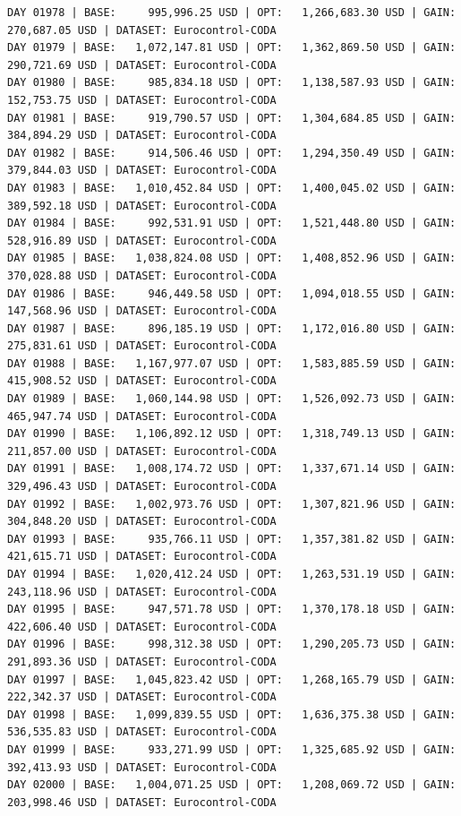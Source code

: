 \documentclass[11pt,a4paper]{article}
\begin{document}
\begin{verbatim}
DAY 01978 | BASE:     995,996.25 USD | OPT:   1,266,683.30 USD | GAIN: 270,687.05 USD | DATASET: Eurocontrol-CODA
DAY 01979 | BASE:   1,072,147.81 USD | OPT:   1,362,869.50 USD | GAIN: 290,721.69 USD | DATASET: Eurocontrol-CODA
DAY 01980 | BASE:     985,834.18 USD | OPT:   1,138,587.93 USD | GAIN: 152,753.75 USD | DATASET: Eurocontrol-CODA
DAY 01981 | BASE:     919,790.57 USD | OPT:   1,304,684.85 USD | GAIN: 384,894.29 USD | DATASET: Eurocontrol-CODA
DAY 01982 | BASE:     914,506.46 USD | OPT:   1,294,350.49 USD | GAIN: 379,844.03 USD | DATASET: Eurocontrol-CODA
DAY 01983 | BASE:   1,010,452.84 USD | OPT:   1,400,045.02 USD | GAIN: 389,592.18 USD | DATASET: Eurocontrol-CODA
DAY 01984 | BASE:     992,531.91 USD | OPT:   1,521,448.80 USD | GAIN: 528,916.89 USD | DATASET: Eurocontrol-CODA
DAY 01985 | BASE:   1,038,824.08 USD | OPT:   1,408,852.96 USD | GAIN: 370,028.88 USD | DATASET: Eurocontrol-CODA
DAY 01986 | BASE:     946,449.58 USD | OPT:   1,094,018.55 USD | GAIN: 147,568.96 USD | DATASET: Eurocontrol-CODA
DAY 01987 | BASE:     896,185.19 USD | OPT:   1,172,016.80 USD | GAIN: 275,831.61 USD | DATASET: Eurocontrol-CODA
DAY 01988 | BASE:   1,167,977.07 USD | OPT:   1,583,885.59 USD | GAIN: 415,908.52 USD | DATASET: Eurocontrol-CODA
DAY 01989 | BASE:   1,060,144.98 USD | OPT:   1,526,092.73 USD | GAIN: 465,947.74 USD | DATASET: Eurocontrol-CODA
DAY 01990 | BASE:   1,106,892.12 USD | OPT:   1,318,749.13 USD | GAIN: 211,857.00 USD | DATASET: Eurocontrol-CODA
DAY 01991 | BASE:   1,008,174.72 USD | OPT:   1,337,671.14 USD | GAIN: 329,496.43 USD | DATASET: Eurocontrol-CODA
DAY 01992 | BASE:   1,002,973.76 USD | OPT:   1,307,821.96 USD | GAIN: 304,848.20 USD | DATASET: Eurocontrol-CODA
DAY 01993 | BASE:     935,766.11 USD | OPT:   1,357,381.82 USD | GAIN: 421,615.71 USD | DATASET: Eurocontrol-CODA
DAY 01994 | BASE:   1,020,412.24 USD | OPT:   1,263,531.19 USD | GAIN: 243,118.96 USD | DATASET: Eurocontrol-CODA
DAY 01995 | BASE:     947,571.78 USD | OPT:   1,370,178.18 USD | GAIN: 422,606.40 USD | DATASET: Eurocontrol-CODA
DAY 01996 | BASE:     998,312.38 USD | OPT:   1,290,205.73 USD | GAIN: 291,893.36 USD | DATASET: Eurocontrol-CODA
DAY 01997 | BASE:   1,045,823.42 USD | OPT:   1,268,165.79 USD | GAIN: 222,342.37 USD | DATASET: Eurocontrol-CODA
DAY 01998 | BASE:   1,099,839.55 USD | OPT:   1,636,375.38 USD | GAIN: 536,535.83 USD | DATASET: Eurocontrol-CODA
DAY 01999 | BASE:     933,271.99 USD | OPT:   1,325,685.92 USD | GAIN: 392,413.93 USD | DATASET: Eurocontrol-CODA
DAY 02000 | BASE:   1,004,071.25 USD | OPT:   1,208,069.72 USD | GAIN: 203,998.46 USD | DATASET: Eurocontrol-CODA

\end{verbatim}
\end{document}
